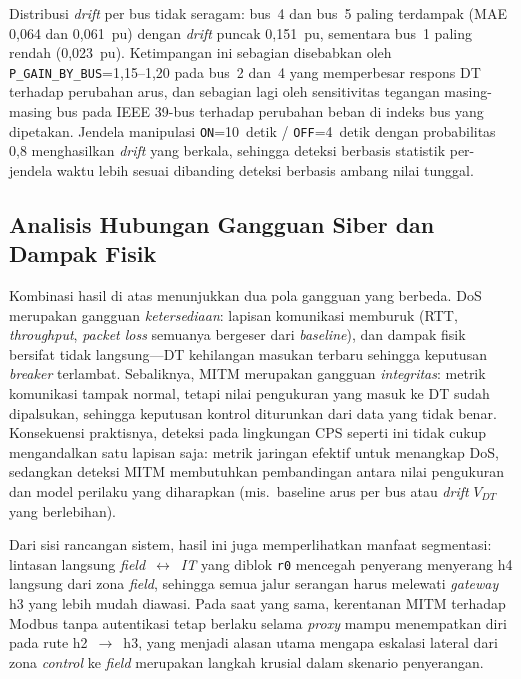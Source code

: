 Distribusi \textit{drift} per bus tidak seragam: bus~4 dan bus~5 paling terdampak (MAE 0{,}064 dan 0{,}061~pu) dengan \textit{drift} puncak 0{,}151~pu, sementara bus~1 paling rendah (0{,}023~pu). Ketimpangan ini sebagian disebabkan oleh \texttt{P\_GAIN\_BY\_BUS}=1{,}15--1{,}20 pada bus~2 dan~4 yang memperbesar respons \ac{DT} terhadap perubahan arus, dan sebagian lagi oleh sensitivitas tegangan masing-masing bus pada IEEE 39-bus terhadap perubahan beban di indeks bus yang dipetakan. Jendela manipulasi \texttt{ON}=10~detik / \texttt{OFF}=4~detik dengan probabilitas 0{,}8 menghasilkan \textit{drift} yang berkala, sehingga deteksi berbasis statistik per-jendela waktu lebih sesuai dibanding deteksi berbasis ambang nilai tunggal.

\subsection{Analisis Hubungan Gangguan Siber dan Dampak Fisik}
\label{subsec:analisis_hubungan_gangguan_siber}
Kombinasi hasil di atas menunjukkan dua pola gangguan yang berbeda. \ac{DoS} merupakan gangguan \textit{ketersediaan}: lapisan komunikasi memburuk (RTT, \textit{throughput}, \textit{packet loss} semuanya bergeser dari \textit{baseline}), dan dampak fisik bersifat tidak langsung---\ac{DT} kehilangan masukan terbaru sehingga keputusan \textit{breaker} terlambat. Sebaliknya, \ac{MITM} merupakan gangguan \textit{integritas}: metrik komunikasi tampak normal, tetapi nilai pengukuran yang masuk ke \ac{DT} sudah dipalsukan, sehingga keputusan kontrol diturunkan dari data yang tidak benar. Konsekuensi praktisnya, deteksi pada lingkungan \ac{CPS} seperti ini tidak cukup mengandalkan satu lapisan saja: metrik jaringan efektif untuk menangkap \ac{DoS}, sedangkan deteksi \ac{MITM} membutuhkan pembandingan antara nilai pengukuran dan model perilaku yang diharapkan (mis.\ baseline arus per bus atau \textit{drift} $V_{DT}$ yang berlebihan).

Dari sisi rancangan sistem, hasil ini juga memperlihatkan manfaat segmentasi: lintasan langsung \textit{field}~$\leftrightarrow$~\textit{IT} yang diblok \texttt{r0} mencegah penyerang menyerang h4 langsung dari zona \textit{field}, sehingga semua jalur serangan harus melewati \textit{gateway} h3 yang lebih mudah diawasi. Pada saat yang sama, kerentanan \ac{MITM} terhadap Modbus tanpa autentikasi tetap berlaku selama \textit{proxy} mampu menempatkan diri pada rute h2~$\rightarrow$~h3, yang menjadi alasan utama mengapa eskalasi lateral dari zona \textit{control} ke \textit{field} merupakan langkah krusial dalam skenario penyerangan.
